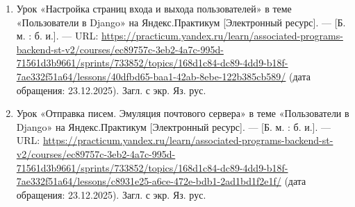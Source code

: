 \documentclass[bachelor, och, pract]{SCWorks}
\begin{document}
\begin{enumerate}
    \item Урок «Настройка страниц входа и выхода пользователей» в теме «Пользователи в Django» на Яндекс.Практикум [Электронный ресурс]. — [Б. м. : б. и.]. — URL: \url{https://practicum.yandex.ru/learn/associated-programs-backend-st-v2/courses/ec89757c-3eb2-4a7c-995d-71561d3b9661/sprints/733852/topics/168d1c84-dc89-4dd9-b18f-7ae332f51a64/lessons/40dfbd65-baa1-42ab-8ebe-122b385cb589/} (дата обращения: 23.12.2025). Загл. с экр. Яз. рус.

    \item Урок «Отправка писем. Эмуляция почтового сервера» в теме «Пользователи в Django» на Яндекс.Практикум [Электронный ресурс]. — [Б. м. : б. и.]. — URL: \url{https://practicum.yandex.ru/learn/associated-programs-backend-st-v2/courses/ec89757c-3eb2-4a7c-995d-71561d3b9661/sprints/733852/topics/168d1c84-dc89-4dd9-b18f-7ae332f51a64/lessons/c8931e25-a6ce-472e-bdb1-2ad1bd1f2e1f/} (дата обращения: 23.12.2025). Загл. с экр. Яз. рус.
\end{enumerate}
\end{document}

